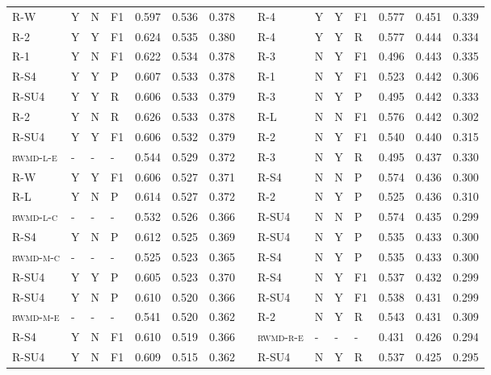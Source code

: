 \documentclass[11pt,a4paper]{article}
\begin{document}
\begin{table}[]
{\begin{tabular}{lllllllllllllll}
\textsc{R-W} & Y & N & F1 & 0.597 & 0.536 & 0.378 &  & \textsc{R-4} & Y & Y & F1 & 0.577 & 0.451 & 0.339 \\
\textsc{R-2} & Y & Y & F1 & 0.624 & 0.535 & 0.380 &  & \textsc{R-4} & Y & Y & R & 0.577 & 0.444 & 0.334 \\
\textsc{R-1} & Y & N & F1 & 0.622 & 0.534 & 0.378 &  & \textsc{R-3} & N & Y & F1 & 0.496 & 0.443 & 0.335 \\
\textsc{R-S4} & Y & Y & P & 0.607 & 0.533 & 0.378 &  & \textsc{R-1} & N & Y & F1 & 0.523 & 0.442 & 0.306 \\
\textsc{R-SU4} & Y & Y & R & 0.606 & 0.533 & 0.379 &  & \textsc{R-3} & N & Y & P & 0.495 & 0.442 & 0.333 \\
\textsc{R-2} & Y & N & R & 0.626 & 0.533 & 0.378 &  & \textsc{R-L} & N & N & F1 & 0.576 & 0.442 & 0.302 \\
\textsc{R-SU4} & Y & Y & F1 & 0.606 & 0.532 & 0.379 &  & \textsc{R-2} & N & Y & F1 & 0.540 & 0.440 & 0.315 \\
\textsc{rwmd-l-e} & - & - & - & 0.544 & 0.529 & 0.372 &  & \textsc{R-3} & N & Y & R & 0.495 & 0.437 & 0.330 \\
\textsc{R-W} & Y & Y & F1 & 0.606 & 0.527 & 0.371 &  & \textsc{R-S4} & N & N & P & 0.574 & 0.436 & 0.300 \\
\textsc{R-L} & Y & N & P & 0.614 & 0.527 & 0.372 &  & \textsc{R-2} & N & Y & P & 0.525 & 0.436 & 0.310 \\
\textsc{rwmd-l-c} & - & - & - & 0.532 & 0.526 & 0.366 &  & \textsc{R-SU4} & N & N & P & 0.574 & 0.435 & 0.299 \\
\textsc{R-S4} & Y & N & P & 0.612 & 0.525 & 0.369 &  & \textsc{R-SU4} & N & Y & P & 0.535 & 0.433 & 0.300 \\
\textsc{rwmd-m-c} & - & - & - & 0.525 & 0.523 & 0.365 &  & \textsc{R-S4} & N & Y & P & 0.535 & 0.433 & 0.300 \\
\textsc{R-SU4} & Y & Y & P & 0.605 & 0.523 & 0.370 &  & \textsc{R-S4} & N & Y & F1 & 0.537 & 0.432 & 0.299 \\
\textsc{R-SU4} & Y & N & P & 0.610 & 0.520 & 0.366 &  & \textsc{R-SU4} & N & Y & F1 & 0.538 & 0.431 & 0.299 \\
\textsc{rwmd-m-e} & - & - & - & 0.541 & 0.520 & 0.362 &  & \textsc{R-2} & N & Y & R & 0.543 & 0.431 & 0.309 \\
\textsc{R-S4} & Y & N & F1 & 0.610 & 0.519 & 0.366 &  & \textsc{rwmd-r-e} & - & - & - & 0.431 & 0.426 & 0.294 \\
\textsc{R-SU4} & Y & N & F1 & 0.609 & 0.515 & 0.362 &  & \textsc{R-SU4} & N & Y & R & 0.537 & 0.425 & 0.295 \\

\end{tabular}}
\end{table}
\end{document}
